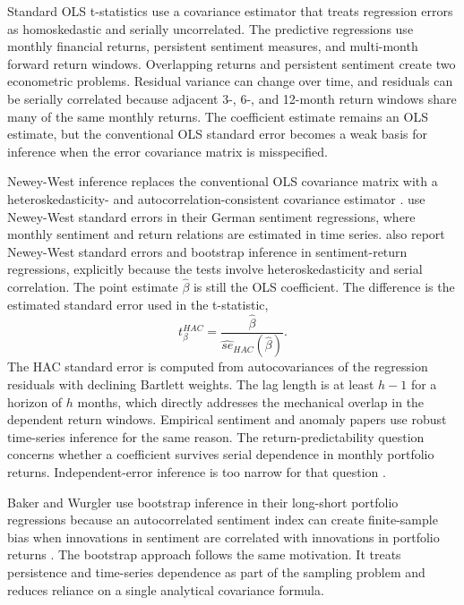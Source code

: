 \documentclass[11pt]{article}
\newcommand{\var}[1]{\ensuremath{#1}}
\begin{document}
Standard OLS t-statistics use a covariance estimator that treats regression errors as homoskedastic and serially uncorrelated. The predictive regressions use monthly financial returns, persistent sentiment measures, and multi-month forward return windows. Overlapping returns and persistent sentiment create two econometric problems. Residual variance can change over time, and residuals can be serially correlated because adjacent 3-, 6-, and 12-month return windows share many of the same monthly returns. The coefficient estimate remains an OLS estimate, but the conventional OLS standard error becomes a weak basis for inference when the error covariance matrix is misspecified.

Newey-West inference replaces the conventional OLS covariance matrix with a heteroskedasticity- and autocorrelation-consistent covariance estimator \citep{newey1987simple}. \citet{finter2012german} use Newey-West standard errors in their German sentiment regressions, where monthly sentiment and return relations are estimated in time series. \citet{ding2019newtheory} also report Newey-West standard errors and bootstrap inference in sentiment-return regressions, explicitly because the tests involve heteroskedasticity and serial correlation. The point estimate \var{\hat{\beta}} is still the OLS coefficient. The difference is the estimated standard error used in the t-statistic,
\begin{equation}
    t^{HAC}_{\beta}
    =
    \frac{\hat{\beta}}{\widehat{se}_{HAC}(\hat{\beta})}.
\end{equation}
The HAC standard error is computed from autocovariances of the regression residuals with declining Bartlett weights. The lag length is at least \var{h-1} for a horizon of \var{h} months, which directly addresses the mechanical overlap in the dependent return windows. Empirical sentiment and anomaly papers use robust time-series inference for the same reason. The return-predictability question concerns whether a coefficient survives serial dependence in monthly portfolio returns. Independent-error inference is too narrow for that question \citep{stambaugh2012short}.

Baker and Wurgler use bootstrap inference in their long-short portfolio regressions because an autocorrelated sentiment index can create finite-sample bias when innovations in sentiment are correlated with innovations in portfolio returns \citep{baker2006sentiment}. The bootstrap approach follows the same motivation. It treats persistence and time-series dependence as part of the sampling problem and reduces reliance on a single analytical covariance formula.
\end{document}
